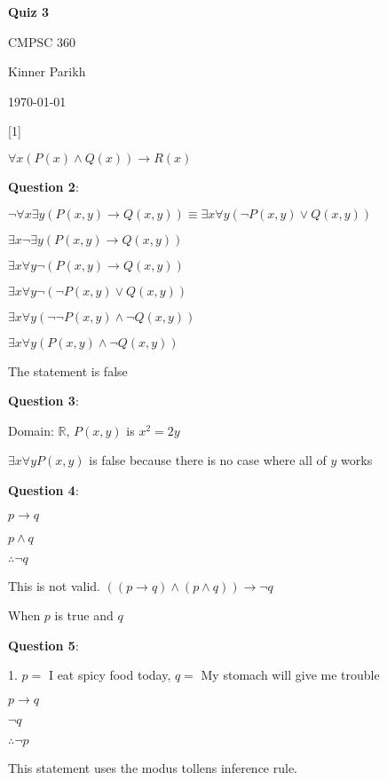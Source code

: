 \documentclass{article} %
\newcommand{\question}[2][]{\begin{flushleft}
        \textbf{Question #1}: \textit{#2}

\end{flushleft}}
\newcommand{\maketitletwo}[2][]{\begin{center}
        \Large{\textbf{Quiz #1}
            
            CMPSC 360} %
        \vspace{5pt}
        
        \normalsize{Kinner Parikh  %
        
        \today}        %
        \vspace{15pt}
        
\end{center}}
\begin{document}
    \maketitletwo[3]  %
    
    \question[1]{}

    $\forall x (P(x) \land Q(x)) \rightarrow R(x)$

    \question[2]{}

    $\neg \forall x \exists y (P(x, y) \rightarrow Q(x, y)) \equiv \exists x \forall y (\neg P(x, y) \lor Q(x, y))$

    $ \exists x \neg \exists y (P(x, y) \rightarrow Q(x, y))$

    $ \exists x\forall y \neg(P(x, y) \rightarrow Q(x, y))$

    $ \exists x\forall y \neg(\neg P(x, y) \lor Q(x, y))$

    $ \exists x\forall y (\neg \neg P(x, y) \land \neg Q(x, y))$

    $ \exists x\forall y (P(x, y) \land \neg Q(x, y))$

    The statement is false

    \question[3]{}

    Domain: $\mathbb{R}$, $P(x, y)$ is $x^2 = 2y$

    $\exists x \forall y P(x, y)$ is false because there is no case where all of $y$ works

    \question[4]{}

    $p \rightarrow q$
    
    \underline{$p \land q$}

    $\therefore \neg q$



    This is not valid.   $((p \rightarrow q) \land (p \land q)) \rightarrow \neg q$

    When $p$ is true and $q$


    \question[5]{}

    1. $p =$ I eat spicy food today, $q =$ My stomach will give me trouble

    \hspace*{0cm}

    \tabto*{0.98cm}$p \rightarrow q$

    \tabto*{0.98cm}\underline{\phantom{...}$\neg q$ \phantom{d}}

    \tabto*{0.98cm} \phantom{} $\therefore \neg p$

    \tabto*{0.98cm}This statement uses the modus tollens inference rule.

    \tabto*{0.98cm}\hspace*{0cm}
\end{document}
